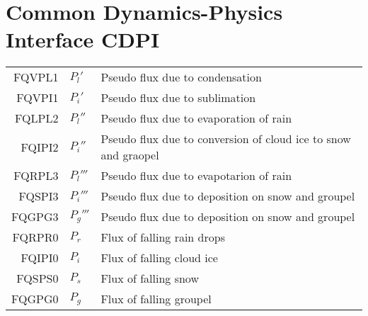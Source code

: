 \section{Common Dynamics-Physics Interface CDPI}
  \begin{tabular}{rll}
      FQVPL1       & $P_l'$ &Pseudo flux due to condensation\\
      FQVPI1       & $P_i'$ &Pseudo flux due to sublimation\\
      FQLPL2       & $P_l''$ & Pseudo flux due to evaporation of rain\\
      FQIPI2       & $P_i''$ &Pseudo flux due to conversion of cloud ice to snow and graopel\\
      FQRPL3       & $P_l'''$&Pseudo flux due to evapotarion of rain\\
      FQSPI3       & $P_i'''$&Pseudo flux due to deposition on snow and groupel\\
      FQGPG3       & $P_g'''$&Pseudo flux due to deposition on snow and groupel\\
      FQRPR0       & $P_r$ &Flux of falling rain drops\\
      FQIPI0       & $P_i$ &Flux of falling cloud ice\\
      FQSPS0       & $P_s$ &Flux of falling snow\\
      FQGPG0       & $P_g$ &Flux of falling groupel\\
  \end{tabular}

